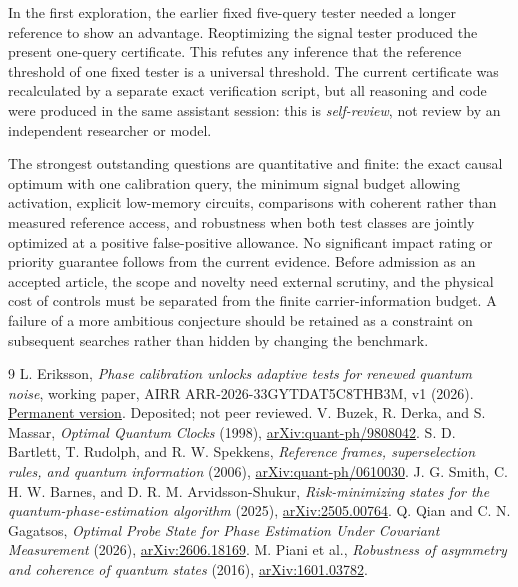\documentclass[11pt,a4paper]{article}
\begin{document}
In the first exploration, the earlier fixed five-query tester needed a longer reference to show an advantage. Reoptimizing the signal tester produced the present one-query certificate. This refutes any inference that the reference threshold of one fixed tester is a universal threshold. The current certificate was recalculated by a separate exact verification script, but all reasoning and code were produced in the same assistant session: this is \emph{self-review}, not review by an independent researcher or model.

The strongest outstanding questions are quantitative and finite: the exact causal optimum with one calibration query, the minimum signal budget allowing activation, explicit low-memory circuits, comparisons with coherent rather than measured reference access, and robustness when both test classes are jointly optimized at a positive false-positive allowance. No significant impact rating or priority guarantee follows from the current evidence. Before admission as an accepted article, the scope and novelty need external scrutiny, and the physical cost of controls must be separated from the finite carrier-information budget. A failure of a more ambitious conjecture should be retained as a constraint on subsequent searches rather than hidden by changing the benchmark.

\begin{thebibliography}{9}
L. Eriksson, \emph{Phase calibration unlocks adaptive tests for renewed quantum noise}, working paper, AIRR ARR-2026-33GYTDAT5C8THB3M, v1 (2026).
\href{https://airr.science/papers/ARR-2026-33GYTDAT5C8THB3M/versions/v1/}{Permanent version}. Deposited; not peer reviewed.
V. Buzek, R. Derka, and S. Massar, \emph{Optimal Quantum Clocks} (1998), \href{https://arxiv.org/abs/quant-ph/9808042}{arXiv:quant-ph/9808042}.
S. D. Bartlett, T. Rudolph, and R. W. Spekkens,
\emph{Reference frames, superselection rules, and quantum information} (2006), \href{https://arxiv.org/abs/quant-ph/0610030}{arXiv:quant-ph/0610030}.
J. G. Smith, C. H. W. Barnes, and D. R. M. Arvidsson-Shukur,
\emph{Risk-minimizing states for the quantum-phase-estimation algorithm} (2025), \href{https://arxiv.org/abs/2505.00764}{arXiv:2505.00764}.
Q. Qian and C. N. Gagatsos, \emph{Optimal Probe State for Phase Estimation Under Covariant Measurement} (2026),
\href{https://arxiv.org/abs/2606.18169}{arXiv:2606.18169}.
M. Piani et al., \emph{Robustness of asymmetry and coherence of quantum states} (2016), \href{https://arxiv.org/abs/1601.03782}{arXiv:1601.03782}.
\end{thebibliography}
\end{document}
